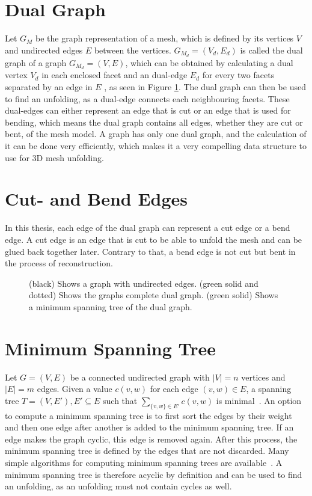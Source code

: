 \documentclass[draft,final]{vutinfth} %
\begin{document}
\section{Dual Graph}
Let $G_M$ be the graph representation of a mesh, which is defined by its vertices $V$ and undirected edges $E$ between the vertices. $G_{M_d} = (V_d, E_d)$ is called the dual graph of a graph $G_{M_d} = (V,E)$, which can be obtained by calculating a dual vertex $V_d$ in each enclosed facet and an dual-edge $E_d$ for every two facets separated by an edge in $E$ \cite{gross2004handbook}, as seen in Figure \ref{fig:dualgraph}. The dual graph can then be used to find an unfolding, as a dual-edge connects each neighbouring facets. These dual-edges can either represent an edge that is cut or an edge that is used for bending, which means the dual graph contains all edges, whether they are cut or bent, of the mesh model. A graph has only one dual graph, and the calculation of it can be done very efficiently, which makes it a very compelling data structure to use for 3D mesh unfolding.

\section{Cut- and Bend Edges}
In this thesis, each edge of the dual graph can represent a cut edge or a bend edge. A cut edge is an edge that is cut to be able to unfold the mesh and can be glued back together later. Contrary to that, a bend edge is not cut but bent in the process of reconstruction.

\begin{figure}

\caption{(black) Shows a graph with undirected edges. (green solid and dotted) Shows the graphs complete dual graph. (green solid) Shows a minimum spanning tree of the dual graph.}
\label{fig:dualgraph}
\end{figure}

\section{Minimum Spanning Tree}
Let $G = (V,E)$ be a connected undirected graph with $|V| = n$ vertices and $|E| = m$ edges. Given a value $c(v,w)$ for each edge $(v,w) \in E$, a spanning tree $T = (V,E'), E' \subseteq E$ such that $\sum_{\{v,w\}\in E'} c(v,w)$ is minimal~\cite{cheriton1976finding}. An option to compute a minimum spanning tree is to first sort the edges by their weight and then one edge after another is added to the minimum spanning tree. If an edge makes the graph cyclic, this edge is removed again. After this process, the minimum spanning tree is defined by the edges that are not discarded. Many simple algorithms for computing minimum spanning trees are available~\cite{kruskal1956shortest,ahuja1990faster}. A minimum spanning tree is therefore acyclic by definition and can be used to find an unfolding, as an unfolding must not contain cycles as well. 
\end{document}
